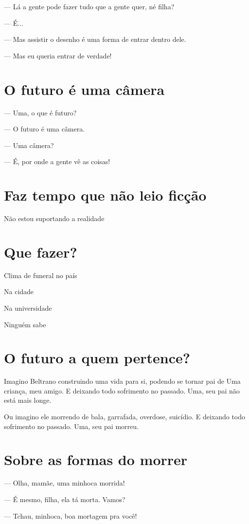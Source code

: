 — Lá a gente pode fazer tudo que a gente quer, né filha?

— É...

— Mas assistir o desenho é uma forma de entrar dentro dele.

— Mas eu queria entrar de verdade!

\chapter{O futuro é uma câmera}

— Uma, o que é futuro?

— O futuro é uma câmera.

— Uma câmera?

— É, por onde a gente vê as coisas!

\chapter{Faz tempo que não leio ficção}

Não estou suportando a realidade

\chapter{Que fazer?}

Clima de funeral no país

Na cidade

Na universidade

Ninguém sabe

\chapter{O futuro a quem pertence?}

Imagino Beltrano construindo uma vida para si, podendo se tornar pai de
Uma criança, meu amigo. E deixando todo sofrimento no passado. Uma, seu
pai não está mais longe.

Ou imagino ele morrendo de bala, garrafada, overdose, suicídio. E
deixando todo sofrimento no passado. Uma, seu pai morreu.

\chapter{Sobre as formas do morrer}

— Olha, mamãe, uma minhoca morrida!

— É mesmo, filha, ela tá morta. Vamos?

— Tchau, minhoca, boa mortagem pra você!

